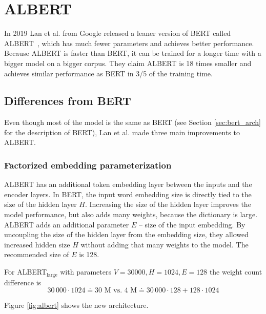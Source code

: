 \documentclass[
  printed, %
  color,   %
  table,   %
  oneside, %
  lof,     %
  lot,     %
]{fithesis3}
\begin{document}
\section{ALBERT}
In 2019 Lan et al. from Google released a leaner version of BERT called ALBERT~\parencite{albert}, which has much fewer parameters and achieves better performance. Because ALBERT is faster than BERT, it can be trained for a longer time with a bigger model on a bigger corpus. They claim ALBERT is 18 times smaller and achieves similar performance as BERT in 3/5 of the training time.

\subsection{Differences from BERT}
\label{sec:albert_pretraining}
Even though most of the model is the same as BERT (see Section \ref{sec:bert_arch} for the description of BERT), Lan et al. made three main improvements to ALBERT.

\subsubsection{Factorized embedding parameterization}
ALBERT has an additional token embedding layer between the inputs and the encoder layers. In BERT, the input word embedding size is directly tied to the size of the hidden layer $H$. Increasing the size of the hidden layer improves the model performance, but also adds many weights, because the dictionary is large. ALBERT adds an additional parameter $E$ -- size of the input embedding. By uncoupling the size of the hidden layer from the embedding size, they allowed increased hidden size $H$ without adding that many weights to the model. The recommended size of $E$ is 128.

\noindent\vbox{\parindent=0pt
 \setlength\abovedisplayskip{0pt}
 \setlength\abovedisplayshortskip{0pt}
 \setlength\belowdisplayskip{0pt}
 \setlength\belowdisplayshortskip{0pt}
For ALBERT$_\text{large}$ with parameters $V = 30000, H=1024, E=128$ the weight count difference is
\begin{equation*}
     30\,000 \cdot 1024 \doteq 30 \text{ M vs. } 4 \text{ M} \doteq 30\,000 \cdot 128 + 128 \cdot 1024
\end{equation*}
}

\vspace{4pt}
{\parindent=0cm
Figure \ref{fig:albert} shows the new architecture.
}
\end{document}
